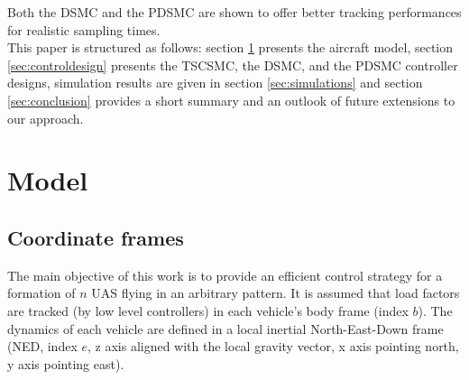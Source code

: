 \documentclass{ifacconf}
\begin{document}
Both the DSMC and the PDSMC are shown to offer better tracking performances for realistic sampling times.\\
This paper is structured as follows: section \ref{sec:model} presents the aircraft model, section \ref{sec:controldesign} presents the TSCSMC, the DSMC, and the PDSMC controller designs, simulation results are given in section \ref{sec:simulations} and section \ref{sec:conclusion} provides a short summary and an outlook of future extensions to our approach.
\section{Model}
\label{sec:model}
\subsection{Coordinate frames}
The main objective of this work is to provide an efficient control strategy for a formation of $n$ UAS flying in an arbitrary pattern. It is assumed that load factors are tracked (by low level controllers) in each vehicle's body frame (index $b$). 
The dynamics of each vehicle are defined in a local inertial North-East-Down frame (NED, index $e$, z axis aligned with the local gravity vector, x axis pointing north, y axis pointing east). 

\end{document}
